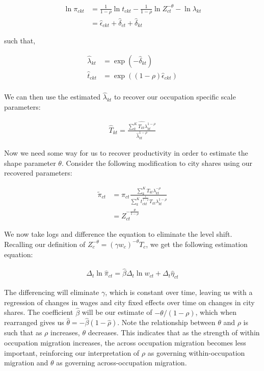 \documentclass[10pt]{article}
\begin{document}
\begin{align*}
    \ln \pi_{ckt} & = \frac{1}{1 - \rho} \ln t_{ckt} - \frac{1}{1 - \rho} \ln Z_{ct}^{- \theta} - \ln \lambda_{kt} \\
                  & = \hat{\epsilon}_{ckt} + \hat{\delta}_{ct} + \hat{\delta}_{kt}
\end{align*}

such that,

\begin{align*}
    \hat{\lambda}_{kt} & = \exp \left( - \hat{\delta}_{kt} \right)             \\
    \hat{t}_{ckt}      & = \exp \left( (1 - \rho) \hat{\epsilon}_{ckt} \right) \\
\end{align*}

We can then use the estimated $\hat{\lambda}_{kt}$ to recover our occupation specific scale parameters:

\begin{align*}
    \hat{T}_{kt} = \frac{\widehat{\sum_{k}^{K} T_{kt} \lambda_{kt}^{1 - \rho}}}{\hat{\lambda}_{kt}^{1 - \rho}}
\end{align*}

Now we need some way for us to recover productivity in order to estimate the shape parameter $\theta$. Consider the following modification to city shares using our recovered parameters:

\begin{align*}
    \tilde{\pi}_{ct} & = \pi_{ct} \frac{\sum_{k}^{K} T_{kt} \lambda_{kt}^{- \rho}}{\sum_{k}^{K} t_{ckt}^{\frac{1}{1 - \rho}} T_{kt} \lambda_{kt}^{1 - \rho}} \\
                     & = Z_{ct}^{- \frac{\theta}{1 - \rho}}
\end{align*}

We now take logs and difference the equation to eliminate the level shift. Recalling our definition of $Z_c^{- \theta} = (\gamma w_c)^{- \theta} T_c$, we get the following estimation equation:

\begin{align*}
    \Delta_t \ln \hat{\pi}_{ct} = \hat{\beta} \Delta_t \ln w_{ct} + \Delta_t \hat{\eta}_{ct}
\end{align*}

The differencing will eliminate $\gamma$, which is constant over time, leaving us with a regression of changes in wages and city fixed effects over time on changes in city shares. The coefficient $\hat{\beta}$ will be our estimate of $ - \theta / (1 - \rho)$, which when rearranged gives us $\hat{\theta} = - \hat{\beta} (1 - \hat{\rho})$. Note the relationship between $\theta$ and $\rho$ is such that as $\rho$ increases, $\theta$ decreases. This indicates that as the strength of within occupation migration increases, the across occupation migration becomes less important, reinforcing our interpretation of $\rho$ as governing within-occupation migration and $\theta$ as governing across-occupation migration.
\end{document}

